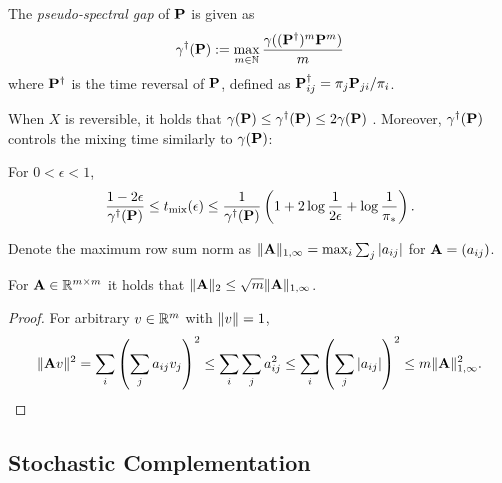\begin{defn}
The \emph{pseudo-spectral gap} of $\mathbf{P}$ is given as
\begin{equation*}
\gamma^\dagger(\mathbf{P}) := \max_{m\in\mathbb{N}} \frac{\gamma((\mathbf{P}^\dagger)^m \mathbf{P}^m)}{m}
\end{equation*}
where $\mathbf{P}^\dagger$ is the time reversal of $\mathbf{P}$, defined as $\mathbf{P}^\dagger_{ij} = \pi_j \mathbf{P}_{ji}/\pi_i$.
\end{defn}

When $X$ is reversible, it holds that $\gamma(\mathbf{P})\le\gamma^\dagger(\mathbf{P})\le 2\gamma(\mathbf{P})$ \citep[Lemma 15]{Wolfer22}. Moreover, $\gamma^\dagger(\mathbf{P})$ controls the mixing time similarly to $\gamma(\mathbf{P})$:

\begin{prop}\label{thm:psmix}
For $0<\epsilon<1$,
\begin{equation*}
\frac{1-2\epsilon}{\gamma^\dagger(\mathbf{P})} \le t_{\operatorname{mix}}(\epsilon) \le \frac{1}{\gamma^\dagger(\mathbf{P})} \left(1+2\log\frac{1}{2\epsilon} +\log\frac{1}{\pi_*}\right).
\end{equation*}
\end{prop}

Denote the maximum row sum norm as $\lVert\mathbf{A}\rVert_{1,\infty} = \max_i\sum_j |a_{ij}|$ for $\mathbf{A}=(a_{ij})$.
\begin{lemma}\label{thm:12norm}
For $\mathbf{A}\in\mathbb{R}^{m\times m}$ it holds that $\lVert\mathbf{A}\rVert_2 \le\sqrt{m} \lVert\mathbf{A}\rVert_{1,\infty}$.
\end{lemma}

\begin{proof}
For arbitrary $v\in\mathbb{R}^m$ with $\lVert v\rVert=1$,
\begin{align*}
\lVert\mathbf{A} v\rVert^2 = \sum_i\left(\sum_j a_{ij}v_j\right)^2 \le \sum_i \sum_j a_{ij}^2 \le \sum_i\left(\sum_j |a_{ij}|\right)^2 \le m\lVert\mathbf{A}\rVert_{1,\infty}^2.
\end{align*}
\end{proof}

\subsection{Stochastic Complementation}\label{sec:stocomp}

